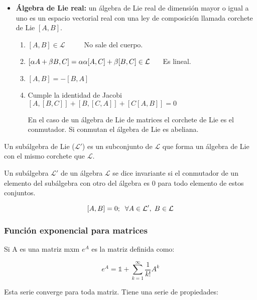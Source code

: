 \begin{itemize}
\item \textbf{Álgebra de Lie real:} un álgebra de Lie real de dimensión mayor o igual a uno es un espacio vectorial real con una ley de composición llamada corchete de Lie $[A,B]$.

\begin{enumerate}

 \item $[A,B] \in \mathcal{L} \hspace{1cm}$ No sale del cuerpo.

 \item $[\alpha A + \beta B,C]=\alpha \alpha[A,C] + \beta [B,C] \in \mathcal{ L} \hspace{0.5cm}$ Es lineal.

\item $[A,B]=-[B,A]$

\item Cumple la identidad de Jacobi $[A,[B,C]]+[B,[C,A]]+[C[A,B]]=0$

En el caso de un álgebra de Lie de matrices el corchete de Lie es el conmutador. Si conmutan el álgebra de Lie es abeliana.
 \end{enumerate}
\end{itemize}

Un subálgebra de Lie ($\mathcal{L}'$) es un subconjunto de $\mathcal{L}$ que forma un álgebra de Lie con el mismo corchete que $\mathcal{L}$.

Un subálgebra $\mathcal{L}'$  de un álgebra $\mathcal{L}$ se dice invariante si el conmutador de un elemento del subálgebra con otro del álgebra es 0 para todo elemento de estos conjuntos.

$$[A,B]=0; \hspace{0.2cm} \forall A\in \mathcal{L}' , \hspace{0.1cm} B \in \mathcal{L}$$

\subsubsection{Función exponencial para matrices}

Si A es una matriz mxm $e^A$ es la matriz definida como:

$$e^A=\mathds{1}+\sum _{k=1}^\infty \frac{1}{k!}A^k$$

Esta serie converge para toda matriz. Tiene una serie de propiedades:

